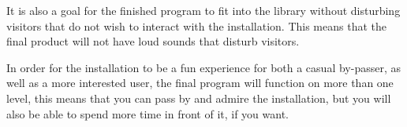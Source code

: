 It is also a goal for the finished program to fit into the library without disturbing visitors that do not wish to interact with the installation. This means that the final product will not have loud sounds that disturb visitors.

In order for the installation to be a fun experience for both a casual by-passer, as well as a more interested user, the final program will function on more than one level, this means that you can pass by and admire the installation, but you will also be able to spend more time in front of it, if you want.


